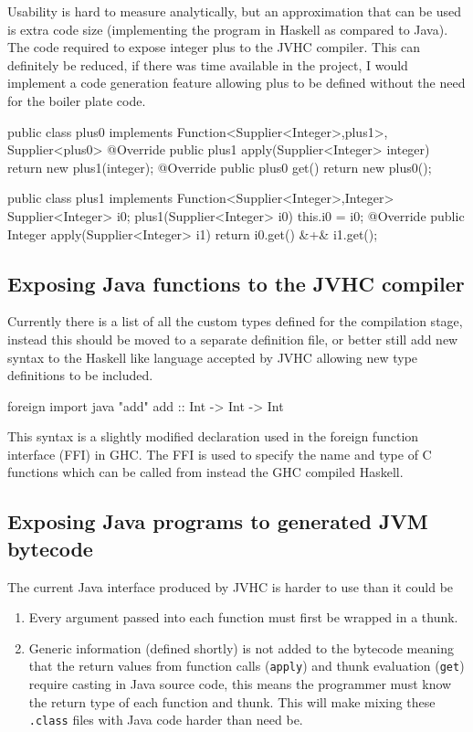 \documentclass[float=false, crop=false]{standalone}
\begin{document}
Usability is hard to measure analytically, but an approximation that can be used is extra code size
(implementing the program in Haskell as compared to Java).
The code required to expose integer plus to the JVHC compiler. 
This can definitely be reduced, if there was time available in the project,
I would implement a code generation feature allowing plus to be defined
without the need for the boiler plate code.

\begin{JavaLst}
public class plus0 implements Function<Supplier<Integer>,plus1>, 
                              Supplier<plus0> {
    @Override
    public plus1 apply(Supplier<Integer> integer) 
      { return new plus1(integer); }
    @Override
    public plus0 get() { return new plus0(); }
}

public class plus1 implements Function<Supplier<Integer>,Integer>{
    Supplier<Integer> i0;
    plus1(Supplier<Integer> i0) { this.i0 = i0; }
    @Override
    public Integer apply(Supplier<Integer> i1) 
      { return i0.get() &\textcolor{pgreen}{+}& i1.get(); }
}
\end{JavaLst}

\subsection{Exposing Java functions to the JVHC compiler}

Currently there is a list of all the custom types defined for the compilation stage,
instead this should be moved to a separate definition file, or better still 
add new syntax to the Haskell like language accepted by JVHC allowing new type
definitions to be included.

\begin{HaskellLst}
foreign import java "add" add :: Int -> Int -> Int
\end{HaskellLst}
This syntax is a slightly modified declaration used in the foreign function interface (FFI) \cite{ghc_ffi} 
in GHC. The FFI is used to specify the name and type of C functions which can be called from 
instead the GHC compiled Haskell.

\subsection{Exposing Java programs to generated JVM bytecode}

The current Java interface produced by JVHC is harder to use than it could be
\begin{enumerate}
  \item Every argument passed into each function must first be wrapped in a thunk. 
  \item Generic information (defined shortly) is not added to the bytecode meaning that
the return values from function calls (\texttt{apply}) and thunk evaluation 
(\texttt{get}) require casting in Java source code, this means the programmer
must know the return type of each function and thunk. This will
make mixing these \verb|.class| files with Java code harder than need be.
\end{enumerate}
\end{document}
